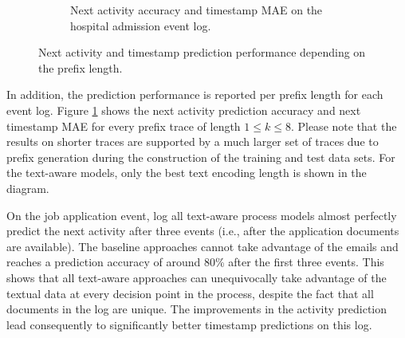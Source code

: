 \begin{figure}[!htbp]
\begin{subfigure}{\textwidth}
		\caption{Next activity accuracy and timestamp MAE on the hospital admission event log.}
	\end{subfigure}
	\caption[Next activity and timestamp prediction performance depending on the prefix length]{Next activity and timestamp prediction performance depending on the prefix length.}
	\label{fig:next-activity-prefix}
\end{figure}

In addition, the prediction performance is reported per prefix length for each event log.
Figure \ref{fig:next-activity-prefix} shows the next activity prediction accuracy and next timestamp MAE for every prefix trace of length $1 \leq k \leq 8$.
Please note that the results on shorter traces are supported by a much larger set of traces due to prefix generation during the construction of the training and test data sets.
For the text-aware models, only the best text encoding length is shown in the diagram.

On the job application event, log all text-aware process models almost perfectly predict the next activity after three events (i.e., after the application documents are available).
The baseline approaches cannot take advantage of the emails and reaches a prediction accuracy of around 80\% after the first three events.
This shows that all text-aware approaches can unequivocally take advantage of the textual data at every decision point in the process, despite the fact that all documents in the log are unique.
The improvements in the activity prediction lead consequently to significantly better timestamp predictions on this log.

